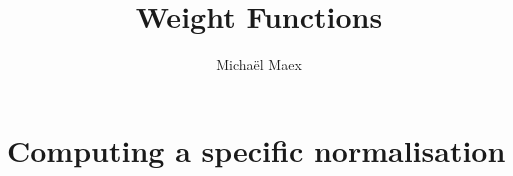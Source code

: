 \documentclass[a4paper]{article}
\title{Weight Functions}
\author{Michaël Maex}
\begin{document}
\maketitle

\tableofcontents



\todototoc
\listoftodos
\pagebreak




\section{Computing a specific normalisation} \label{sec:computing_a_specific_normalisation}



\pagebreak
\printbibliography
\end{document}
